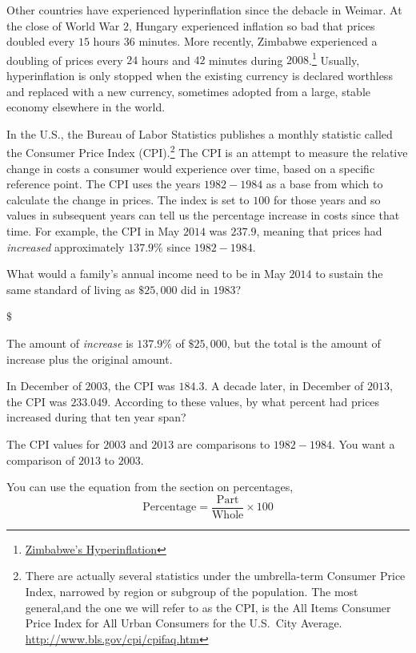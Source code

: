 \documentclass{ximera}
\begin{document}
Other countries have experienced hyperinflation since the debacle in Weimar. At the close of World War $2$, Hungary experienced inflation so bad that prices doubled every $15$ hours $36$ minutes. More recently, Zimbabwe experienced a doubling of prices every $24$ hours and $42$ minutes during $2008$.\footnote{\href{http://www.cato.org/zimbabwe}{Zimbabwe's Hyperinflation}} Usually, hyperinflation is only stopped when the existing currency is declared worthless and replaced with a new currency, sometimes adopted from a large, stable economy elsewhere in the world.

In the U.S., the Bureau of Labor Statistics publishes a monthly statistic called the Consumer Price Index (CPI).\footnote{There are actually several statistics under the umbrella-term Consumer Price Index, narrowed by region or subgroup of the population. The most general,and the one we will refer to as the CPI, is the All Items Consumer Price Index for All Urban Consumers for the U.S.\ City Average. \href{http://www.bls.gov/cpi/cpifaq.htm}{http://www.bls.gov/cpi/cpifaq.htm}} The CPI is an attempt to measure the relative change in costs a consumer would experience over time, based on a specific reference point. The CPI uses the years $1982-1984$ as a base from which to calculate the change in prices. The index is set to $100$ for those years and so values in subsequent years can tell us the percentage increase in costs since that time. For example, the CPI in May $2014$ was $237.9$, meaning that prices had \emph{increased} approximately $137.9\%$ since $1982-1984$.

\begin{question}
What would a family's annual income need to be in May $2014$ to sustain the same standard of living as $\$25,000$ did in $1983$?

$\$$

\begin{hint}
The amount of \emph{increase} is $137.9\%$ of $\$25,000$, but the total is the amount of increase plus the original amount.
\end{hint}
\end{question}

\begin{question}
In December of $2003$, the CPI was $184.3$. A decade later, in December of $2013$, the CPI was $233.049$. According to these values, by what percent had prices increased during that ten year span?


\begin{multipleChoice}
\end{multipleChoice}

\begin{hint}
The CPI values for $2003$ and $2013$ are comparisons to $1982-1984$. You want a comparison of $2013$ to $2003$.
\end{hint}

\begin{hint}
You can use the equation from the section on percentages, \[ \text{Percentage}=\frac{\text{Part}}{\text{Whole}}\times 100 \]
\end{hint}

\end{question}
\end{document}
